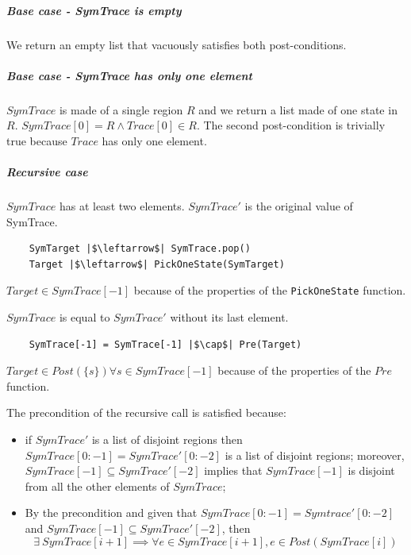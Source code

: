 \documentclass[12pt]{article}
\begin{document}
    \subparagraph*{Base case - SymTrace is empty}
    We return an empty list that vacuously satisfies both post-conditions.

    \subparagraph*{Base case - SymTrace has only one element}

    $SymTrace$ is made of a single region $R$ and we return a list made of one state in $R$.
    $SymTrace[0] = R \wedge Trace[0] \in R$.
    The second post-condition is trivially true because $Trace$ has only one element.

    \subparagraph*{Recursive case}
    $SymTrace$ has at least two elements.
    $SymTrace'$ is the original value of SymTrace.

    \begin{verbatim}
    SymTarget |$\leftarrow$| SymTrace.pop()
    Target |$\leftarrow$| PickOneState(SymTarget)
    \end{verbatim}

    \noindent
    $Target \in SymTrace[-1]$ because of the properties of the \texttt{PickOneState} function.

    \noindent
    $SymTrace$ is equal to $SymTrace'$ without its last element.
     
    \begin{verbatim}
    SymTrace[-1] = SymTrace[-1] |$\cap$| Pre(Target)
    \end{verbatim}

    \noindent
    $Target \in Post(\{s\}) \forall s \in SymTrace[-1]$ because of the properties of the $Pre$ function.

    \noindent
    The precondition of the recursive call is satisfied because:
    \begin{itemize}
        \item if $SymTrace'$ is a list of disjoint regions then $SymTrace[0:-1] = SymTrace'[0:-2]$ is a list of disjoint regions;
        moreover, $SymTrace[-1] \subseteq SymTrace'[-2]$ implies that $SymTrace[-1]$ is disjoint from all the other elements of $SymTrace$;
        \item By the precondition and given that $SymTrace[0:-1] = Symtrace'[0:-2]$ and $SymTrace[-1] \subseteq SymTrace'[-2] $, then
        \begin{equation*}
            \exists\ SymTrace[i+1] \implies \forall e \in SymTrace[i+1], e \in Post(SymTrace[i])
        \end{equation*}
    \end{itemize}
\end{document}
